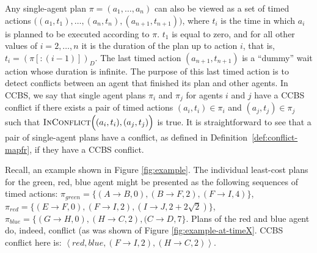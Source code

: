\documentclass[review]{elsarticle}
\newtheorem{lemma}{Lemma}
\newcommand{\tuple}[1]{\ensuremath{\left \langle #1 \right \rangle }}
\newcommand\roni[1]{\nb{\textbf{Roni:}}{green}{#1}}
\newcommand{\ccbs}{\ac{CCBS}\xspace}
\newcommand{\inconflict}{\textsc{InConflict}\xspace}
\begin{document}
Any single-agent plan $\pi = (a_1,\ldots, a_n)$ can also be viewed as a set of timed actions $\big( (a_1,t_1),\ldots,(a_n,t_n) ,(a_{n+1},t_{n+1}) \big)$, where $t_i$ is the time in which $a_i$ is planned to be executed according to $\pi$. 
$t_1$ is equal to zero, and for all other values of $i=2,\ldots, n$ it is the duration of the plan up to action $i$, that is, $t_i=(\pi[:(i-1)])_D$. 
The last timed action $(a_{n+1}, t_{n+1})$ is a ``dummy'' wait action whose duration is infinite. The purpose of this last timed action is to detect conflicts between an agent that finished its plan and other agents. 
In \ccbs, we say that single agent plans $\pi_i$ and $\pi_j$ for agents $i$ and $j$ have a \ccbs  conflict if there exists a pair of timed actions $(a_i,t_i)\in \pi_i$ and $(a_j,t_j)\in \pi_j$ such that $\inconflict \Big((a_i,t_i), (a_j,t_j)\Big)$ is true. 
It is straightforward to see that a pair of single-agent plans 
have a conflict, as defined in Definition~\ref{def:conflict-mapfr},
if they have a \ccbs conflict.

Recall, an example shown in Figure \ref{fig:example}. The individual least-cost plans for the green, red, blue agent might be presented as the following sequences of timed actions:  $\pi_{green}=\{(A \rightarrow B, 0), (B \rightarrow F, 2), (F \rightarrow I, 4)\}$, $\pi_{red}=\{(E \rightarrow F, 0), (F \rightarrow I, 2), (I \rightarrow J, 2+2\sqrt{2})\}$, $\pi_{blue}=\{(G \rightarrow H, 0), (H \rightarrow C, 2), (C \rightarrow D, 7\}$. Plans of the red and blue agent do, indeed, conflict (as was shown of Figure \ref{fig:example-at-timeX}. \ccbs conflict here is: $\tuple{red, blue, (F \rightarrow I, 2), (H \rightarrow C, 2)}$.  


\end{document}
